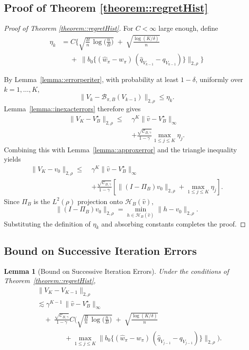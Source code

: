 \documentclass{article}
\theoremstyle{plain}
\newtheorem{lemma}{Lemma}
\theoremstyle{definition}
\theoremstyle{remark}
\begin{document}
\subsection{Proof of Theorem \ref{theorem::regretHist}}

\begin{proof}[Proof of Theorem \ref{theorem::regretHist}]
For \(C<\infty\) large enough, define
\begin{align*}
  \eta_k
&=
C \Bigg\{\sqrt{\frac{B}{n}\,\log\!\Big(\frac{n}{B}\Big)}
\;+\;
\sqrt{\frac{\log(K/\delta)}{n}}
\\
& \quad
\;+\;
\big\|
b_0\{(\widehat w_{\pi} - w_{\pi})\,
(\widehat q_{V_{k-1}} - q_{V_{k-1}})\}
\big\|_{2,\rho}
\Bigg\}
\end{align*}

By Lemma~\ref{lemma::errorperiter}, with probability at least \(1-\delta\),
uniformly over \(k=1,\ldots,K\),
\[
\|V_k-\mathcal B_{\pi,B}(V_{k-1})\|_{2,\rho}
\le
\eta_k .
\]
Lemma~\ref{lemma::inexacterrors} therefore gives
\begin{align*}
\|V_K - V_B^\star\|_{2,\rho}
\le\;&
\gamma^K\|\hat v - V_B^\star\|_\infty\\
&+
\frac{\sqrt{\mathcal C_{B,\gamma}}}{1-\gamma}
\max_{1\le j\le K}\eta_j .
\end{align*}
Combining this with Lemma~\ref{lemma::approxerror} and the triangle inequality
yields
\begin{align*}
\|V_K-v_0\|_{2,\rho}
\le\;&
\gamma^K\|\hat v - V_B^\star\|_\infty\\
&+
\frac{\sqrt{\mathcal C_{B,\gamma}}}{1-\gamma}
\left[
\|(I-\Pi_B)v_0\|_{2,\rho}
+
\max_{1\le j\le K}\eta_j
\right].
\end{align*}
Since \(\Pi_B\) is the \(L^2(\rho)\) projection onto
\(\mathcal H_B(\hat v)\),
\[
\|(I-\Pi_B)v_0\|_{2,\rho}
=
\min_{h\in\mathcal H_B(\hat v)}\|h-v_0\|_{2,\rho}.
\]
Substituting the definition of \(\eta_k\) and absorbing constants completes the
proof.
\end{proof}






\subsection{Bound on Successive Iteration Errors}
\label{appendix::convergence}
\begin{lemma}[Bound on Successive Iteration Errors]
Under the conditions of Theorem~\ref{theorem::regretHist},
\begin{align*}
&\|V_K - V_{K-1}\|_{2,\rho}\\
&\lesssim
\gamma^{K-1}\,
\|\hat v - V_B^\star\|_{\infty}
\\[0.8em]
&\quad+\;
\frac{\sqrt{\mathcal C_{B,\gamma}}}{1-\gamma}
C\Bigg(
\sqrt{\frac{B}{n}\,\log\!\Big(\frac{n}{B}\Big)}
\;+\;
\sqrt{\frac{\log(K/\delta)}{n}}
\\[0.8em]
&\qquad\qquad+
\max_{1\le j\le K}
\Big\|
b_0\{
(\widehat w_{\pi} - w_{\pi})\,
(\widehat q_{V_{j-1}} - q_{V_{j-1}})
\}
\big\|_{2,\rho}
\Bigg).
\end{align*}
\end{lemma}
\end{document}
